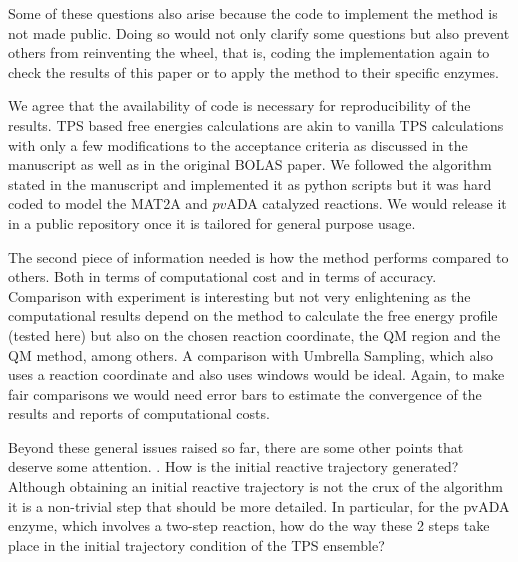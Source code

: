 \documentclass[journal=jpcbfk,manuscript=article,layout=traditional]{achemso}
\begin{document}
{\begin{response}{Some of these questions also arise because the 
code to implement the method is not made public. Doing so would 
not only clarify some questions but also prevent others from 
reinventing the wheel, that is, coding the implementation again 
to check the results of this paper or to apply the method to their specific enzymes.}

We agree that the availability of code is necessary for reproducibility of the results.
TPS based free energies calculations are akin to vanilla TPS calculations with 
only a few modifications to the acceptance criteria as discussed in the manuscript as well
as in the original BOLAS paper. We followed the algorithm stated in the manuscript
and implemented it as python scripts but it was hard coded to model the MAT2A and 
$\textit{pv}$ADA catalyzed reactions. We would release it in a public repository once it is 
tailored for general purpose usage.  
\end{response}

\begin{response}{The second piece of information needed is how the method 
performs compared to others. Both in terms of computational cost and in 
terms of accuracy. Comparison with experiment is interesting but not very 
enlightening as the computational results depend on the method to calculate 
the free energy profile (tested here) but also on the chosen reaction coordinate, 
the QM region and the QM method, among others. A comparison with Umbrella Sampling, 
which also uses a reaction coordinate and also uses windows would be ideal. Again, 
to make fair comparisons we would need error bars to estimate the convergence of 
the results and reports of computational costs.}


\end{response}

\begin{response}{Beyond these general issues raised so far, there are some other points 
that deserve some attention.
. How is the initial reactive trajectory generated? Although obtaining an initial reactive 
trajectory is not the crux of the algorithm it is a non-trivial step that should be more 
detailed. In particular, for the pvADA enzyme, which involves a two-step reaction, how 
do the way these 2 steps take place in the initial trajectory condition of the TPS ensemble?}


\end{response}}
\end{document}
